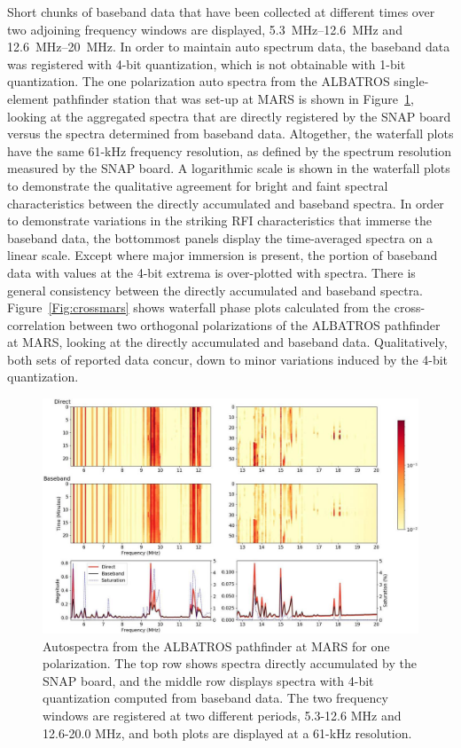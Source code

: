 Short chunks of baseband data that have been collected at different times over two adjoining frequency windows are displayed, \SIrange{5.3}{12.6}{\mega \hertz} and \SIrange{12.6}{20}{\mega \hertz}. In order to maintain auto spectrum data, the baseband data was registered with 4-bit quantization, which is not obtainable with 1-bit quantization. The one polarization auto spectra from the ALBATROS single-element pathfinder station that was set-up at MARS is shown in Figure~\ref{Fig:mars}, looking at the aggregated spectra that are directly registered by the SNAP board versus the spectra determined from baseband data. Altogether, the waterfall plots have the same 61-kHz frequency resolution, as defined by the spectrum resolution measured by the SNAP board. A logarithmic scale is shown in the waterfall plots to demonstrate the qualitative agreement for bright and faint spectral characteristics between the directly accumulated and baseband spectra. In order to demonstrate variations in the striking RFI characteristics that immerse the baseband data, the bottommost panels display the time-averaged spectra on a linear scale. Except where major immersion is present, the portion of baseband data with values at the 4-bit extrema is over-plotted with spectra. There is general consistency between the directly accumulated and baseband spectra. Figure~\ref{Fig:crossmars} shows waterfall phase plots calculated from the cross-correlation between two orthogonal polarizations of the ALBATROS pathfinder at MARS, looking at the directly accumulated and baseband data. Qualitatively, both sets of reported data concur, down to minor variations induced by the 4-bit quantization.

\begin{figure}
	\centering
	\includegraphics[width=\linewidth]{Figures/mars}
	\caption{ Autospectra from the ALBATROS pathfinder at MARS for one polarization. The top row shows spectra directly accumulated by the SNAP board, and the middle row displays spectra with 4-bit quantization computed from baseband data. The two frequency windows are registered at two different periods, 5.3-12.6 MHz and 12.6-20.0 MHz, and both plots are displayed at a 61-kHz resolution.}
	\label{Fig:mars}
\end{figure}

